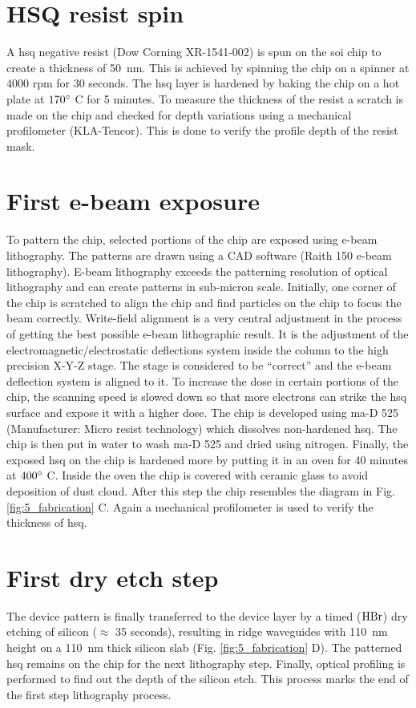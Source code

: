 \documentclass[../report.tex]{subfiles}
\begin{document}
\section{HSQ resist spin}
A \gls{hsq} negative resist (Dow Corning XR-1541-002) is spun on the \gls{soi} chip to create a thickness of \SI{50}{\nano \meter}. This is achieved by spinning the chip on a spinner at 4000 rpm for 30 seconds. The \gls{hsq} layer is hardened by baking the chip on a hot plate at $\mathrm{170^{\circ}}$ C for 5 minutes. To measure the thickness of the resist a scratch is made on the chip and checked for depth variations using a mechanical profilometer (KLA-Tencor). This is done to verify the profile depth of the resist mask.

\section{First e-beam exposure}
To pattern the chip, selected portions of the chip are exposed using e-beam lithography. The patterns are drawn using a CAD software (Raith 150 e-beam lithography). E-beam lithography exceeds the patterning resolution of optical lithography and can create patterns in sub-micron scale. Initially, one corner of the chip is scratched to align the chip and find particles on the chip to focus the beam correctly. Write-field alignment is a very central adjustment in the process of getting the best possible e-beam lithographic result. It is the adjustment of the electromagnetic/electrostatic deflections system inside the column to the high precision X-Y-Z stage. The stage is considered to be ``correct'' and the e-beam deflection system is aligned to it. To increase the dose in certain portions of the chip, the scanning speed is slowed down so that more electrons can strike the \gls{hsq} surface and expose it with a higher dose. The chip is developed using ma-D 525 (Manufacturer: Micro resist technology) which dissolves non-hardened \gls{hsq}. The chip is then put in water to wash ma-D 525 and dried using nitrogen. Finally, the exposed \gls{hsq} on the chip is hardened more by putting it in an oven for 40 minutes at $\mathrm{400^{\circ}}$ C. Inside the oven the chip is covered with ceramic glass to avoid deposition of dust cloud. After this step the chip resembles the diagram in Fig. \ref{fig:5_fabrication} C. Again a mechanical profilometer is used to verify the thickness of \gls{hsq}.    

\section{First dry etch step}
The device pattern is finally transferred to the device layer by a timed ($\mathrm{HBr}$) dry etching of silicon ($\approx$ 35 seconds), resulting in ridge waveguides with \SI{110}{\nano \meter} height on a \SI{110}{\nano \meter} thick silicon slab (Fig. \ref{fig:5_fabrication} D). The patterned \gls{hsq} remains on the chip for the next lithography step. Finally, optical profiling is performed to find out the depth of the silicon etch. This process marks the end of the first step lithography process.
\end{document}
